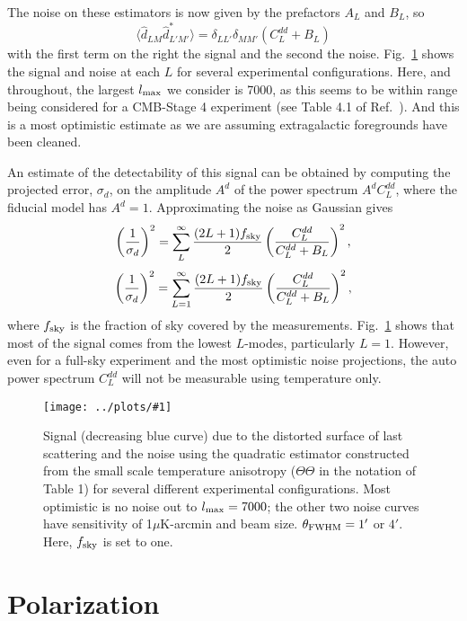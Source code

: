 \documentclass[prd,amsmath,amssymb,floatfix,superscriptaddress,nofootinbib,twocolumn]{revtex4-1}
\def\be{\begin{equation}}
\def\ee{\end{equation}}
\newcommand{\eql}[1]{\label{eq:#1}}
\newcommand{\sfig}[2]{
\texttt{[image: ../plots/\#1]}
        }
\newcommand{\Sfig}[2]{
   \begin{figure}[thbp]
   \begin{center}
    \sfig{#1.pdf}{\columnwidth}
    \caption{{\small #2}}
    \label{fig:#1}
     \end{center}
   \end{figure}
}
\newcommand{\rf}[1]{\ref{fig:#1}}
\newcommand{\peikai}[1]{{\color{blue} #1}}
\newcommand{\prvs}[1]{{\color{magenta} #1}}
\begin{document}
The noise on these estimators is now given by the prefactors $A_L$ and $B_L$, so  
\be
\langle \hat d_{LM} \hat d^*_{L'M'}  \rangle = \delta_{LL'}\delta_{MM'} \left( C_L^{dd} + B_L \right)
\ee
with the first term on the right the signal and the second the noise. Fig.~\rf{Delay} shows the signal and noise at each $ L$ for several experimental configurations. Here, and throughout, the largest $l_{\rm max}$ we consider is 7000, as this seems to be within range being considered for a CMB-Stage 4 experiment (see Table 4.1 of Ref.~\cite{Abazajian:2016yjj}). \peikai{And this is a most optimistic estimate as we are assuming extragalactic foregrounds have been cleaned.}

An estimate of the detectability of this signal can be obtained by computing the projected error, $\sigma_d$, on the amplitude $A^d$ of the power spectrum $A^dC_L^{dd}$, where the fiducial model has $A^d=1$.  Approximating the noise as Gaussian gives
\prvs{
\begin{eqnarray*}
\left(\frac{1}{\sigma_d}\right)^2 = \sum_L^{\infty} \frac{(2L+1)f_{\rm sky}}{2} \left(\frac{C_L^{dd}}{C_L^{dd}+B_L}\right)^2,
\eql{sn}
\end{eqnarray*}
}
\peikai{
\be
\left(\frac{1}{\sigma_d}\right)^2 = \sum_{L=1}^{\infty} \frac{(2L+1)f_{\rm sky}}{2} \left(\frac{C_L^{dd}}{C_L^{dd}+B_L}\right)^2,
\eql{sn}
\ee
}
where $f_{\rm sky}$ is the fraction of sky covered by the measurements.
Fig.~\rf{Delay} shows that most of the signal comes from the lowest $L$-modes, particularly $L=1$. However, even for a full-sky experiment and the most optimistic noise projections, the
auto power spectrum $C_L^{dd}$ will not be measurable using temperature only.



\Sfig{Delay}{Signal (decreasing blue curve) due to the distorted surface of last scattering and the noise using the quadratic estimator constructed from the small scale temperature anisotropy ($\Theta\Theta$ in the notation of Table 1) for several different experimental configurations. Most optimistic is no noise out to $l_{\rm max}=7000$; the other two noise curves have sensitivity of 1$\mu$K-arcmin and beam size. $\theta_{\rm FWHM}=1'$ or $4'$. Here, $f_{\rm sky}$ is set to one.} 




\section{Polarization}
\end{document}
